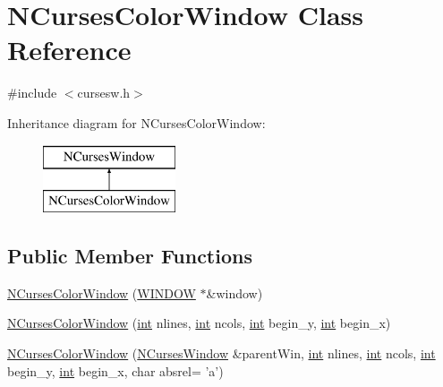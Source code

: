 \hypertarget{class_n_curses_color_window}{\section{N\-Curses\-Color\-Window Class Reference}
\label{class_n_curses_color_window}
}


{\ttfamily \#include $<$cursesw.\-h$>$}

Inheritance diagram for N\-Curses\-Color\-Window\-:\begin{figure}[H]
\begin{center}
\leavevmode
\includegraphics[height=2.000000cm]{class_n_curses_color_window}
\end{center}
\end{figure}
\subsection*{Public Member Functions}
\begin{DoxyCompactItemize}
\item 
\hyperlink{class_n_curses_color_window_ae6132d074355020a2d62b44565df7df3}{N\-Curses\-Color\-Window} (\hyperlink{curses_8priv_8h_aa64cc90e7a4df667d6c7249b77890d39}{W\-I\-N\-D\-O\-W} $\ast$\&window)
\item 
\hyperlink{class_n_curses_color_window_a4cf612a2c19594562139652f72b92f01}{N\-Curses\-Color\-Window} (\hyperlink{term__entry_8h_ad65b480f8c8270356b45a9890f6499ae}{int} nlines, \hyperlink{term__entry_8h_ad65b480f8c8270356b45a9890f6499ae}{int} ncols, \hyperlink{term__entry_8h_ad65b480f8c8270356b45a9890f6499ae}{int} begin\-\_\-y, \hyperlink{term__entry_8h_ad65b480f8c8270356b45a9890f6499ae}{int} begin\-\_\-x)
\item 
\hyperlink{class_n_curses_color_window_a3a7297faf472182dc70f4962d0bd95b8}{N\-Curses\-Color\-Window} (\hyperlink{class_n_curses_window}{N\-Curses\-Window} \&parent\-Win, \hyperlink{term__entry_8h_ad65b480f8c8270356b45a9890f6499ae}{int} nlines, \hyperlink{term__entry_8h_ad65b480f8c8270356b45a9890f6499ae}{int} ncols, \hyperlink{term__entry_8h_ad65b480f8c8270356b45a9890f6499ae}{int} begin\-\_\-y, \hyperlink{term__entry_8h_ad65b480f8c8270356b45a9890f6499ae}{int} begin\-\_\-x, char absrel= 'a')
\end{DoxyCompactItemize}
